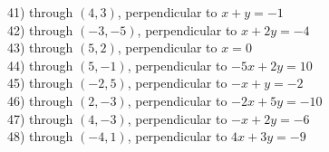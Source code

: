\documentclass[12pt]{article}
\theoremstyle{definition}
\begin{document}
41) through $(4, 3)$, perpendicular to $x + y = - 1$\\
42) through $(- 3, - 5)$, perpendicular to $x + 2 y = -4$\\
43) through $(5, 2)$, perpendicular to $x = 0$\\
44) through $(5, - 1)$, perpendicular to $- 5 x + 2 y =10$\\
45) through $(- 2, 5)$, perpendicular to $- x + y = - 2$\\
46) through $(2, - 3)$, perpendicular to $- 2 x + 5 y = -10$\\
47) through $(4, - 3)$, perpendicular to $- x + 2 y = -6$\\
48) through $(- 4, 1)$, perpendicular to $4 x + 3 y = -9$
\newpage
\ \newpage
\end{document}
